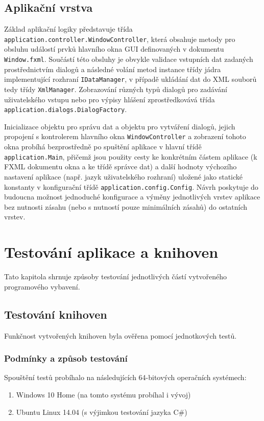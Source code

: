 \documentclass[onepage, a4paper, 12pt]{bakalarka}
\begin{document}
\section{Aplikační vrstva}
Základ aplikační logiky představuje třída \texttt{application.controller.WindowController}, která obsahuje metody pro obsluhu událostí prvků hlavního okna GUI definovaných v dokumentu \texttt{Window.fxml}. Součástí této obsluhy je obvykle validace vstupních dat zadaných prostřednictvím dialogů a následné volání metod instance třídy jádra implementující rozhraní \texttt{IDataManager}, v případě ukládání dat do XML souborů tedy třídy \texttt{XmlManager}. Zobrazování různých typů dialogů pro zadávání uživatelského vstupu nebo pro výpisy hlášení zprostředkovává třída \texttt{application.dialogs.DialogFactory}.\par
Inicializace objektu pro správu dat a objektu pro vytváření dialogů, jejich propojení s kontrolerem hlavního okna \texttt{WindowController} a zobrazení tohoto okna probíhá bezprostředně po spuštění aplikace v hlavní třídě \texttt{application.Main}, přičemž jsou použity cesty ke konkrétním částem aplikace (k FXML dokumentu okna a ke třídě správce dat) a další hodnoty výchozího nastavení aplikace (např. jazyk uživatelského rozhraní) uložené jako statické konstanty v konfigurační třídě \texttt{application.config.Config}. Návrh poskytuje do budoucna možnost jednoduché konfigurace a výměny jednotlivých vrstev aplikace bez nutnosti zásahu (nebo s nutností pouze minimálních zásahů) do ostatních vrstev.

\chapter{Testování aplikace a knihoven}
Tato kapitola shrnuje způsoby testování jednotlivých částí vytvořeného programového vybavení.
\section{Testování knihoven}
Funkčnost vytvořených knihoven byla ověřena pomocí jednotkových testů.

\subsection{Podmínky a způsob testování}
Spouštění testů probíhalo na následujících 64-bitových operačních systémech:
\begin{enumerate}
\item{Windows 10 Home (na tomto systému probíhal i vývoj)}
\item{Ubuntu Linux 14.04 (s výjimkou testování jazyka C\#)}
\end{enumerate}
\end{document}
